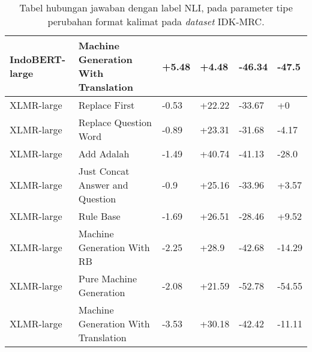 \begin{table}[H]
\begin{tabular}{llllll}
IndoBERT-large & Machine Generation With Translation &        +5.48 &        +4.48 &      -46.34 &       -47.5 \\
\hline
    XLMR-large &                       Replace First &        -0.53 &       +22.22 &      -33.67 &          +0 \\
    XLMR-large &               Replace Question Word &        -0.89 &       +23.31 &      -31.68 &       -4.17 \\
    XLMR-large &                          Add Adalah &        -1.49 &       +40.74 &      -41.13 &       -28.0 \\
    XLMR-large &     Just Concat Answer and Question &         -0.9 &       +25.16 &      -33.96 &       +3.57 \\
    XLMR-large &                           Rule Base &        -1.69 &       +26.51 &      -28.46 &       +9.52 \\
    XLMR-large &          Machine Generation With RB &        -2.25 &        +28.9 &      -42.68 &      -14.29 \\
    XLMR-large &             Pure Machine Generation &        -2.08 &       +21.59 &      -52.78 &      -54.55 \\
    XLMR-large & Machine Generation With Translation &        -3.53 &       +30.18 &      -42.42 &      -11.11 \\
\bottomrule
\end{tabular}
\caption{Tabel hubungan jawaban dengan label NLI, pada parameter tipe perubahan format kalimat pada \emph{dataset} IDK-MRC.}
\end{table}